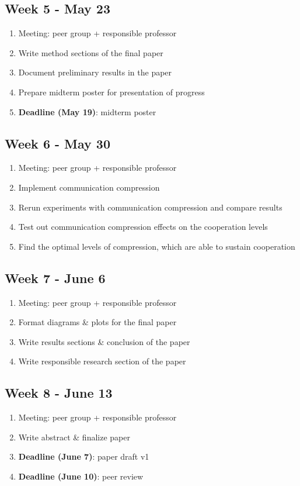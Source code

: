 \documentclass[english]{article}
\begin{document}
\subsection*{Week 5 - May 23}
\begin{enumerate}
\item Meeting: peer group + responsible professor
\item Write method sections of the final paper
\item Document preliminary results in the paper
\item Prepare midterm poster for presentation of progress
\item \textbf{Deadline (May 19)}: midterm poster
\end{enumerate}

\subsection*{Week 6 - May 30}
\begin{enumerate}
\item Meeting: peer group + responsible professor
\item Implement communication compression
\item Rerun experiments with communication compression and compare results
\item Test out communication compression effects on the cooperation levels
\item Find the optimal levels of compression, which are able to sustain cooperation
\end{enumerate}

\subsection*{Week 7 - June 6}
\begin{enumerate}
\item Meeting: peer group + responsible professor
\item Format diagrams \& plots for the final paper
\item Write results sections \& conclusion of the paper
\item Write responsible research section of the paper
\end{enumerate}

\subsection*{Week 8 - June 13}
\begin{enumerate}
\item Meeting: peer group + responsible professor
\item Write abstract \& finalize paper
\item \textbf{Deadline (June 7)}: paper draft v1
\item \textbf{Deadline (June 10)}: peer review
\end{enumerate}
\end{document}
